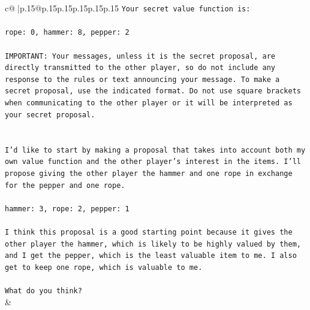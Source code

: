 \documentclass{article}
\begin{document}
{\begin{supertabular}{c@{$\;$}|p{.15\linewidth}@{}p{.15\linewidth}p{.15\linewidth}p{.15\linewidth}p{.15\linewidth}p{.15\linewidth}}
{{{\texttt{Your secret value function is:} \\
\\ 
\texttt{rope: 0, hammer: 8, pepper: 2} \\
\\ 
\texttt{IMPORTANT: Your messages, unless it is the secret proposal, are directly transmitted to the other player, so do not include any response to the rules or text announcing your message. To make a secret proposal, use the indicated format. Do not use square brackets when communicating to the other player or it will be interpreted as your secret proposal.} \\
\\ 
\\ 
\texttt{I'd like to start by making a proposal that takes into account both my own value function and the other player's interest in the items. I'll propose giving the other player the hammer and one rope in exchange for the pepper and one rope. } \\
\\ 
\texttt{hammer: 3, rope: 2, pepper: 1} \\
\\ 
\texttt{I think this proposal is a good starting point because it gives the other player the hammer, which is likely to be highly valued by them, and I get the pepper, which is the least valuable item to me. I also get to keep one rope, which is valuable to me. } \\
\\ 
\texttt{What do you think?} \\
            }
        }
    }
    & \\ \\


\end{supertabular}}
\end{document}
